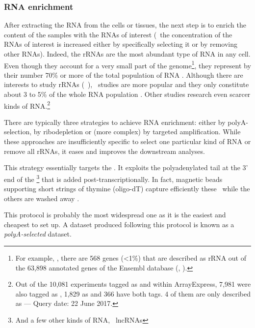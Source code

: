 \subsubsection{\gls{RNA} enrichment}

After extracting the \gls{RNA} from the cells or tissues,
the next step is to enrich the content of the samples with the \glspl{RNA}
of interest (\ie\ the concentration of the \glspl{RNA} of interest is increased
either by specifically selecting it or by removing other \glspl{RNA}). Indeed,
the \glspl{rRNA} are the most abundant type of \gls{RNA} in any cell. Even
though they account for a very small part of the genome\footnote{For example,
, there are 568 genes (<1\%) that are described as
\gls{rRNA} out of the 63,898 annotated genes of the \gls{Ensembl} database
(, ).}, they represent by their number 70\% or more of
the total population of \gls{RNA} .
Although there are interests to study \glspl{rRNA} (\eg\ ),
\mRNAs\ studies are more
popular and they only constitute about 3 to 5\% of the whole \gls{RNA} population
. Other studies research even scarcer kinds of
\gls{RNA}.\footnote{Out of the 10,081 experiments tagged as  and  within \gls{ArrayExpress},
7,981 were also tagged as ,
1,829 as  and 366 have both tags.
4 of them are only described as  --- Query date: 22 June 2017.}

There are typically three strategies to achieve \gls{RNA} enrichment:
either by polyA-selection, by ribodepletion or (more complex)
by targeted amplification. While these
approaches are insufficiently specific to select one particular kind of \gls{RNA}
or remove all \glspl{rRNA}, it eases and improves the downstream analyses.

\label{msec:polyA}
This strategy essentially targets the \mRNAs. It exploits the polyadenylated
tail at the 3' end of the \mRNAs\footnote{And a few other kinds of \gls{RNA},
\eg\ \glspl{lncRNA} } that is added
post-transcriptionally. In fact, magnetic beads supporting short
strings of thymine (oligo-dT) capture efficiently these \mRNAs\ while the others
are washed away .

This protocol is probably the most widespread one as it is the easiest and
cheapest to set up. A dataset produced following this protocol is known as
a \emph{polyA-selected} dataset.

